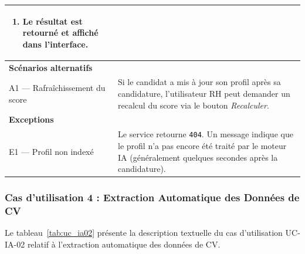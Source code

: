 \begin{longtable}{|p{4cm}|p{10cm}|}
{\begin{enumerate}
    \item Le résultat est retourné et affiché dans l'interface.
\end{enumerate}
\vspace{2pt}
} \\ \hline
\multicolumn{2}{|l|}{\textbf{Scénarios alternatifs}} \\ \hline
A1 — Rafraîchissement du score &
Si le candidat a mis à jour son profil après sa candidature, l'utilisateur RH peut demander un recalcul du score via le bouton \textit{Recalculer}. \\ \hline
\multicolumn{2}{|l|}{\textbf{Exceptions}} \\ \hline
E1 — Profil non indexé & Le service retourne \texttt{404}. Un message indique que le profil n'a pas encore été traité par le moteur IA (généralement quelques secondes après la candidature). \\ \hline
\end{longtable}
\renewcommand{\arraystretch}{1}

\subsubsection{Cas d'utilisation 4 : Extraction Automatique des Données de CV}

Le tableau~\ref{tab:uc_ia02} présente la description textuelle du cas d'utilisation UC-IA-02 relatif à l'extraction automatique des données de CV.

